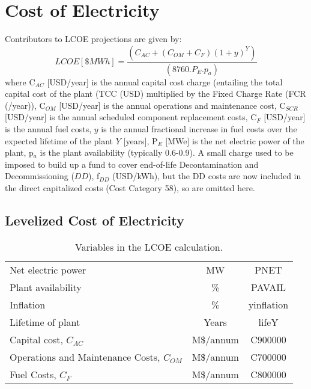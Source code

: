 \newpage 

\section{Cost of Electricity} 

 Contributors to LCOE projections are given by: 
 \begin{equation} 
 LCOE [\$ MWh] = \frac{(C_{AC} + (C_{OM} + C_{F})(1+y)^Y)}{(8760.P_E.p_a)} 
 \label{eq:coe}
\end{equation} 
where C$_{AC}$ [USD/year] is the annual capital cost charge (entailing the total capital cost of the plant (TCC (USD) multiplied by the Fixed Charge Rate (FCR (/year)), C$_{OM}$ [USD/year] is the annual operations and maintenance cost, C$_{SCR}$ [USD/year] is the annual scheduled component replacement costs, C$_{F}$ [USD/year] is the annual fuel costs, $y$ is the annual fractional increase in fuel costs over the expected lifetime of the plant $Y$ [years], P$_{E}$ [MWe] is the net electric power of the plant, p$_{a}$ is the plant availability (typically 0.6-0.9).  A small charge used to be imposed to build up a fund to cover end-of-life Decontamination and Decommissioning ($DD$), f$_{DD}$ (USD/kWh), but the DD costs are now included in the direct capitalized costs (Cost Category 58), so are omitted here.

%
%
%

\subsection{Levelized Cost of Electricity} 

\begin{table}[h!] 
\begin{tabular}{l c c } 
Net electric power & MW & PNET \\
Plant availability & \% & PAVAIL \\
Inflation & \% & yinflation \\
Lifetime of plant & Years & lifeY \\
Capital cost, $C_{AC}$ &     M\$/annum    &    C900000      \\ 
Operations and Maintenance Costs, $C_{OM}$ & M\$/annum  &      C700000 \\ 
Fuel Costs, $C_{F}$ & M\$/annum  &       C800000 \\ 
    \end{tabular} 
    \caption{Variables in the LCOE calculation.}
    \label{tab:lcoe} 
\end{table} 

